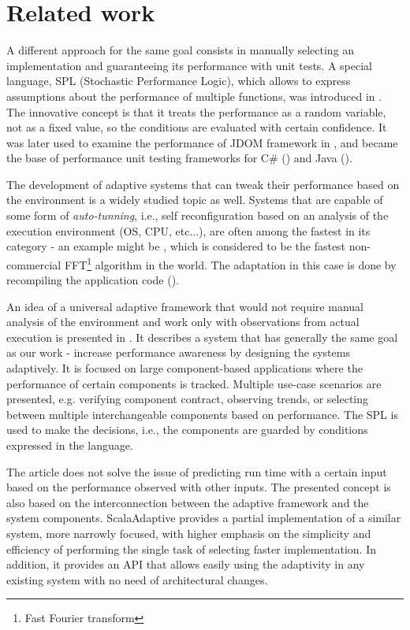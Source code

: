 \chapter{Related work}

A different approach for the same goal consists in manually selecting an implementation and guaranteeing its performance with unit tests. A special language, SPL (Stochastic Performance Logic), which allows to express assumptions about the performance of multiple functions, was introduced in \cite{bulej_capturing_2012}. The innovative concept is that it treats the performance as a random variable, not as a fixed value, so the conditions are evaluated with certain confidence. It was later used to examine the performance of JDOM framework in \cite{horky_performance_2013}, and became the base of performance unit testing frameworks for C\# (\cite{Trojanek:Thesis:2013}) and Java (\cite{Kotrc:Thesis:2015}).

The development of adaptive systems that can tweak their performance based on the environment is a widely studied topic as well. Systems that are capable of some form of \textit{auto-tunning}, i.e., self reconfiguration based on an analysis of the execution environment (OS, CPU, etc...), are often among the fastest in its category - an example might be \cite{frigo_fftw:_1998},  which is considered to be the fastest non-commercial FFT\footnote{Fast Fourier transform} algorithm in the world. The adaptation in this case is done by recompiling the application code (\cite{frigo_fast_1999}).

An idea of a universal adaptive framework that would not require manual analysis of the environment and work only with observations from actual execution is presented in \cite{bulej_performance_2012}. It describes a system that has generally the same goal as our work - increase performance awareness by designing the systems adaptively. It is focused on large component-based applications where the performance of certain components is tracked. Multiple use-case scenarios are presented, e.g. verifying component contract, observing trends, or selecting between multiple interchangeable components based on performance. The SPL is used to make the decisions, i.e., the components are guarded by conditions expressed in the language.

The article does not solve the issue of predicting run time with a certain input based on the performance observed with other inputs. The presented concept is also based on the interconnection between the adaptive framework and the system components. ScalaAdaptive provides a partial implementation of a similar system, more narrowly focused, with higher emphasis on the simplicity and efficiency of performing the single task of selecting faster implementation. In addition, it provides an API that allows easily using the adaptivity in any existing system with no need of architectural changes.

